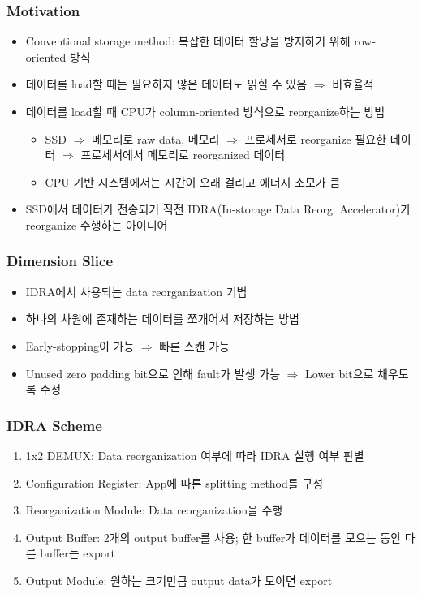 \subsubsection*{Motivation}
\begin{itemize}
    \item Conventional storage method: 복잡한 데이터 할당을 방지하기 위해 row-oriented 방식
    \item 데이터를 load할 때는 필요하지 않은 데이터도 읽힐 수 있음 $\Rightarrow$ 비효율적
    \item 데이터를 load할 때 CPU가 column-oriented 방식으로 reorganize하는 방법
    \begin{itemize}
        \item SSD $\Rightarrow$ 메모리로 raw data, 메모리 $\Rightarrow$ 프로세서로 reorganize 필요한 데이터 $\Rightarrow$ 프로세서에서 메모리로 reorganized 데이터
        \item CPU 기반 시스템에서는 시간이 오래 걸리고 에너지 소모가 큼
    \end{itemize}
    \item SSD에서 데이터가 전송되기 직전 IDRA(In-storage Data Reorg. Accelerator)가 reorganize 수행하는 아이디어
\end{itemize}

\subsubsection*{Dimension Slice}
\begin{itemize}
    \item IDRA에서 사용되는 data reorganization 기법
    \item 하나의 차원에 존재하는 데이터를 쪼개어서 저장하는 방법
    \item Early-stopping이 가능 $\Rightarrow$ 빠른 스캔 가능
    \item Unused zero padding bit으로 인해 fault가 발생 가능 $\Rightarrow$ Lower bit으로 채우도록 수정
\end{itemize}

\subsubsection*{IDRA Scheme}
\begin{enumerate}
    \item 1x2 DEMUX: Data reorganization 여부에 따라 IDRA 실행 여부 판별
    \item Configuration Register: App에 따른 splitting method를 구성
    \item Reorganization Module: Data reorganization을 수행
    \item Output Buffer: 2개의 output buffer를 사용; 한 buffer가 데이터를 모으는 동안 다른 buffer는 export
    \item Output Module: 원하는 크기만큼 output data가 모이면 export
\end{enumerate}
\begin{figures}
\end{figures}

